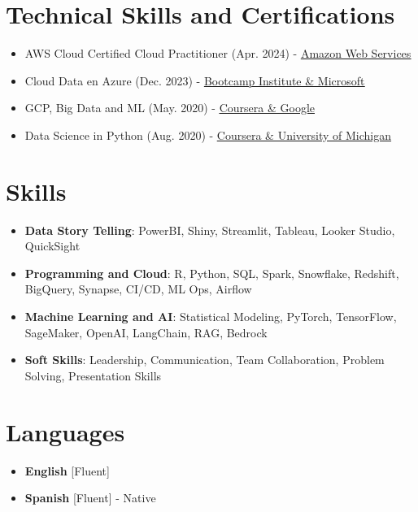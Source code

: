 \documentclass[11pt,a4paper,sans]{moderncv}
\begin{document}
\section{Technical Skills and Certifications}
{\begin{itemize}[label=\textbullet, itemsep=-0.2em]
\item AWS Cloud Certified Cloud Practitioner (Apr. 2024) - \underline{\color{blue}\href{https://www.credly.com/badges/b1438ac5-468e-4964-b6ac-2894b7e2204b/linked_in_profile}{Amazon Web Services}}
\item Cloud Data en Azure (Dec. 2023) - \underline{\color{blue}\href{https://www.credential.net/f49190f2-99e2-4af9-83a9-26bef312b87f?username=ronaldfriizmegosolano20070}{Bootcamp Institute \& Microsoft}}
\item GCP, Big Data and ML (May. 2020) - \underline{\color{blue}\href{https://www.coursera.org/account/accomplishments/certificate/RPWJ8S2L8CYW}{Coursera \& Google}}
\item Data Science in Python (Aug. 2020) - \underline{\color{blue}\href{https://www.coursera.org/account/accomplishments/verify/MYX5XU65HP95}{Coursera \& University of Michigan}}
\end{itemize}}


\vspace{-1.5em}

\section{Skills}
\begin{itemize}[label=\textbullet, itemsep=-0.2em]
\item \textbf{Data Story Telling}: PowerBI, Shiny, Streamlit, Tableau, Looker Studio, QuickSight
\item \textbf{Programming and Cloud}: R, Python, SQL, Spark, Snowflake, Redshift, BigQuery, Synapse, CI/CD, ML Ops, Airflow
\item \textbf{Machine Learning and AI}: Statistical Modeling, PyTorch, TensorFlow, SageMaker, OpenAI, LangChain, RAG, Bedrock
\item \textbf{Soft Skills}: Leadership, Communication, Team Collaboration, Problem Solving, Presentation Skills
\end{itemize}


\vspace{-1.5em}

\section{Languages}
\begin{multicols}{2}
\begin{itemize}[label=\textbullet, itemsep=-0.2em]
\item \textbf{English} [Fluent]
\item \textbf{Spanish} [Fluent] - Native
\end{itemize}
\end{multicols}
\end{document}
